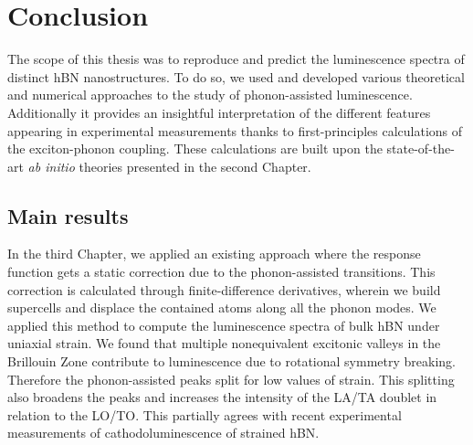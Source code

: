 \chapter*{Conclusion}

The scope of this thesis was to reproduce and predict the luminescence spectra of distinct hBN nanostructures. To do so, we used and developed various theoretical and numerical approaches to the study of phonon-assisted luminescence.
Additionally it provides an insightful interpretation of the different features appearing in experimental measurements thanks to first-principles calculations of the exciton-phonon coupling. These calculations are built upon the state-of-the-art \textit{ab initio} theories presented in the second Chapter.

\section*{Main results}
In the third Chapter, we applied an existing approach where the response function gets a static correction due to the phonon-assisted transitions. This correction is calculated through finite-difference derivatives, wherein we build supercells and displace the contained atoms along all the phonon modes. We applied this method to compute the luminescence spectra of bulk hBN under uniaxial strain. We found that multiple nonequivalent excitonic valleys in the Brillouin Zone contribute to luminescence due to rotational symmetry breaking.
Therefore the phonon-assisted peaks split for low values of strain. This splitting also broadens the peaks and increases the intensity of the LA/TA doublet in relation to the LO/TO.
This partially agrees with recent experimental measurements of cathodoluminescence of strained \acrshort{hBN}.\\

